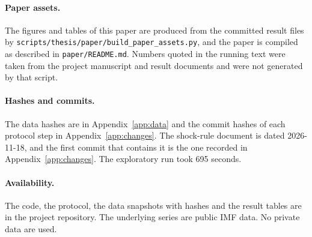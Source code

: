 \paragraph{Paper assets.} The figures and tables of this paper are produced from the committed result files by \texttt{scripts/thesis/paper/build\_paper\_assets.py}, and the paper is compiled as described in \texttt{paper/README.md}. Numbers quoted in the running text were taken from the project manuscript and result documents and were not generated by that script.

\paragraph{Hashes and commits.} The data hashes are in Appendix~\ref{app:data} and the commit hashes of each protocol step in Appendix~\ref{app:changes}. The shock-rule document is dated 2026-11-18, and the first commit that contains it is the one recorded in Appendix~\ref{app:changes}. The exploratory run took 695 seconds.

\paragraph{Availability.} The code, the protocol, the data snapshots with hashes and the result tables are in the project repository. The underlying series are public IMF data. No private data are used.
